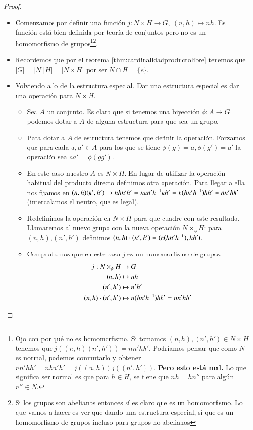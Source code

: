 \begin{proof}$ $\newline
	\begin{itemize}
		\item Comenzamos por definir una función $j: N\times H \to G,\ (n, h) \mapsto nh$. Es función está bien definida por teoría de conjuntos pero no es un homomorfismo de grupos\footnote{Ojo con por qué no es homomorfismo. Si tomamos $(n,h),(n', h') \in N \times H$ tenemos que $j((n,h)(n',h')) = nn'hh'$. Podríamos pensar que como $N$ es normal, podemos conmutarlo y obtener $nn'hh' = nhn'h' = j((n,h))j((n',h'))$. \textbf{Pero esto está mal.} Lo que significa ser normal es que para $h \in H$, se tiene que $nh = hn''$ para algún $n'' \in N$.}\footnote{Si los grupos son abelianos entonces sí es claro que es un homomorfismo. Lo que vamos a hacer es ver que dando una estructura especial, sí que es un homomorfismo de grupos incluso para grupos no abelianos}.
		\item Recordemos que por el teorema \ref{thm:cardinalidadproductolibre} tenemos que $|G| = |N||H| = |N \times H|$ por ser $N \cap H = \{e\}$.
		\item Volviendo a lo de la estructura especial. Dar una estructura especial es dar una operación para $N \times H$.
		\begin{itemize}
			\item Sea $A$ un conjunto. Es claro que si tenemos una biyección $\phi : A \to G$ podemos dotar a $A$ de alguna estructura para que sea un grupo.
			\item Para dotar a $A$ de estructura tenemos que definir la operación. Forzamos que para cada $a, a' \in A$ para los que se tiene $\phi(g) = a, \phi(g') = a'$ la operación sea $a a'  = \phi(gg')$.
			\item En este caso nuestro $A$ es $N \times H$. En lugar de utilizar la operación habitual del producto directo definimos otra operación. Para llegar a ella nos fijamos en $(n,h)(n',h') \mapsto nhn'h' = nhn'h^{-1}hh' = n(hn'h^{-1})hh' = nn'hh'$ (intercalamos el neutro, que es legal).
			\item Redefinimos la operación en $N \times H$ para que cuadre con este resultado. Llamaremos al nuevo grupo con la nueva operación $N \times_\phi H$: para $(n,h), (n',h')$ definimos $(n,h)\cdot (n',h') = (n(hn'h^{-1}), hh')$.
			\item Comprobamos que en este caso $j$ es un homomorfismo de grupos:
			\begin{align*}
			j : N \times_\phi H &\to G \\
			(n,h) &\mapsto nh \\
			(n',h') &\mapsto n'h' \\
			(n,h)\cdot(n',h') &\mapsto n(hn'h^{-1})hh' = nn'hh'
			\end{align*}
		\end{itemize} 
	\end{itemize}
\end{proof}

